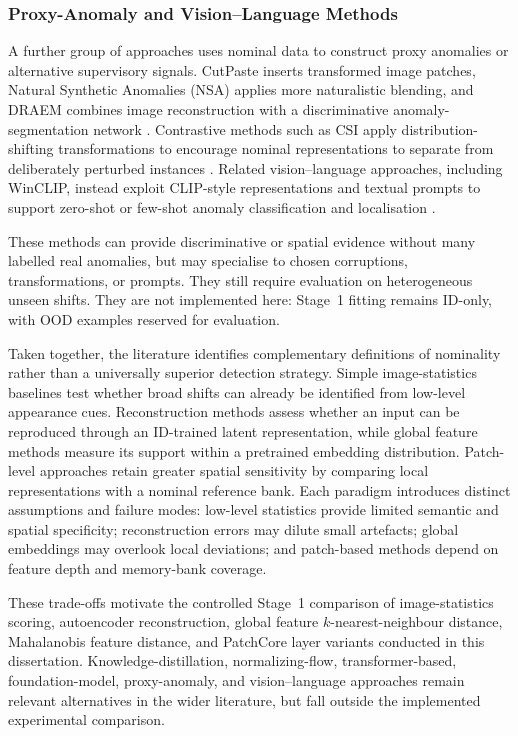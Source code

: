 \documentclass[fleqn,12pt]{olplainarticle}
\begin{document}
\subsubsection{Proxy-Anomaly and Vision--Language Methods}

A further group of approaches uses nominal data to construct proxy anomalies or alternative supervisory signals. CutPaste inserts transformed image patches, Natural Synthetic Anomalies (NSA) applies more naturalistic blending, and DRAEM combines image reconstruction with a discriminative anomaly-segmentation network \cite{li2021cutpaste,schluter2022natural,zavrtanik2021draem}. Contrastive methods such as CSI apply distribution-shifting transformations to encourage nominal representations to separate from deliberately perturbed instances \cite{tack2020csi}. Related vision--language approaches, including WinCLIP, instead exploit CLIP-style representations and textual prompts to support zero-shot or few-shot anomaly classification and localisation \cite{jeong2023winclip}.

These methods can provide discriminative or spatial evidence without many labelled real anomalies, but may specialise to chosen corruptions, transformations, or prompts. They still require evaluation on heterogeneous unseen shifts. They are not implemented here: Stage~1 fitting remains ID-only, with OOD examples reserved for evaluation.

Taken together, the literature identifies complementary definitions of nominality rather than a universally superior detection strategy. Simple image-statistics baselines test whether broad shifts can already be identified from low-level appearance cues. Reconstruction methods assess whether an input can be reproduced through an ID-trained latent representation, while global feature methods measure its support within a pretrained embedding distribution. Patch-level approaches retain greater spatial sensitivity by comparing local representations with a nominal reference bank. Each paradigm introduces distinct assumptions and failure modes: low-level statistics provide limited semantic and spatial specificity; reconstruction errors may dilute small artefacts; global embeddings may overlook local deviations; and patch-based methods depend on feature depth and memory-bank coverage.

These trade-offs motivate the controlled Stage~1 comparison of image-statistics scoring, autoencoder reconstruction, global feature $k$-nearest-neighbour distance, Mahalanobis feature distance, and PatchCore layer variants conducted in this dissertation. Knowledge-distillation, normalizing-flow, transformer-based, foundation-model, proxy-anomaly, and vision--language approaches remain relevant alternatives in the wider literature, but fall outside the implemented experimental comparison.
\end{document}
